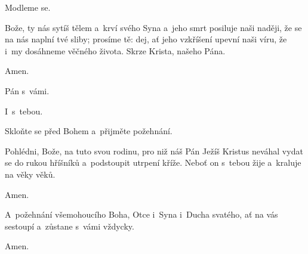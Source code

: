 \mbox{}

Modleme se.

Bože, ty nás sytíš tělem a~krví svého Syna a~jeho smrt posiluje naši naději, že se na nás naplní tvé sliby; prosíme tě: dej, ať jeho vzkříšení upevní naši víru, že i~my dosáhneme věčného života. Skrze Krista, našeho Pána.

\Rbardot{} Amen.

\mbox{}

\Vbardot{} Pán s~vámi.

\Rbardot{} I~s~tebou.

\Vbardot{} Skloňte se před Bohem a~přijměte požehnání.

\mbox{}

Pohlédni, Bože, na tuto svou rodinu, pro niž náš Pán Ježíš Kristus neváhal vydat se do rukou hříšníků a~podstoupit utrpení kříže. Neboť on s~tebou žije a~kraluje na věky věků.

\Rbardot{} Amen.

A~požehnání všemohoucího Boha, Otce i~Syna \grecross{} i~Ducha svatého, ať na vás sestoupí a~zůstane s~vámi vždycky.

\Rbardot{} Amen.
